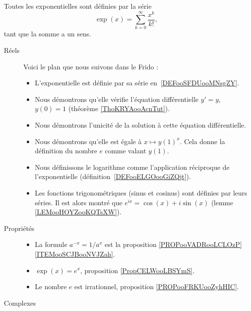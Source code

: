         \label{THEMEooKXSGooCsQNoY}

Toutes les exponentielles sont définies par la série
\begin{equation*}
	\exp(x)=\sum_{k=0}^{\infty}\frac{ x^k }{ k! },
\end{equation*}
tant que la somme a un sens.

\begin{description}
	\item[Réels]

		Voici le plan que nous suivons dans le Frido :
		\begin{itemize}
			\item L'exponentielle est définie par sa série en~\ref{DEFooSFDUooMNsgZY}.
			\item Nous démontrons qu'elle vérifie l'équation différentielle \( y'=y\), \( y(0)=1\) (théorème \ref{ThoKRYAooAcnTut}).
			\item Nous démontrons l'unicité de la solution à cette équation différentielle.
			\item Nous démontrons qu'elle est égale à \( x\mapsto y(1)^x\). Cela donne la définition du nombre \( e\) comme valant \( y(1)\).
			\item Nous définissons le logarithme comme l'application réciproque de l'exponentielle (définition~\ref{DEFooELGOooGiZQjt}).
			\item Les fonctions trigonométriques (sinus et cosinus) sont définies par leurs séries. Il est alors montré que \( e^{ix}=\cos(x)+i\sin(x)\) (lemme \ref{LEMooHOYZooKQTsXW}).
		\end{itemize}

	\item[Propriétés]
		\begin{itemize}
			\item
			      La formule \( a^{-x}=1/a^x\) est la proposition \ref{PROPooVADRooLCLOzP}\ref{ITEMooSCJBooNVJZah}.
			\item
			      \( \exp(x)= e^{x}\), proposition \ref{PropCELWooLBSYmS}.
			\item
			      Le nombre \( e\) est irrationnel, proposition \ref{PROPooFRKUooZyhHIC}.
		\end{itemize}

	\item[Complexes]


\end{description}
